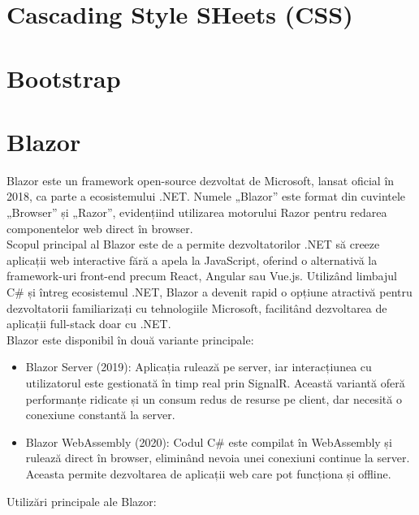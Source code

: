 \section{Cascading Style SHeets (CSS)}
\section{Bootstrap}
\section{Blazor}
 {\hspace*{1cm} Blazor este un framework open-source dezvoltat de Microsoft, lansat oficial în 2018, ca parte a ecosistemului .NET. Numele „Blazor” este format din cuvintele „Browser” și „Razor”, evidențiind utilizarea motorului Razor pentru redarea componentelor web direct în browser.}\parencite{blazor}\\
{\hspace*{1cm} Scopul principal al Blazor este de a permite dezvoltatorilor .NET să creeze aplicații web interactive fără a apela la JavaScript, oferind o alternativă la framework-uri front-end precum React, Angular sau Vue.js. Utilizând limbajul C\# și întreg ecosistemul .NET, Blazor a devenit rapid o opțiune atractivă pentru dezvoltatorii familiarizați cu tehnologiile Microsoft, facilitând dezvoltarea de aplicații full-stack doar cu .NET.}\parencite{blazor}\\
{Blazor este disponibil în două variante principale:}
\begin{itemize}
    \item Blazor Server (2019): Aplicația rulează pe server, iar interacțiunea cu utilizatorul este gestionată în timp real prin SignalR. Această variantă oferă performanțe ridicate și un consum redus de resurse pe client, dar necesită o conexiune constantă la server.
    \item Blazor WebAssembly (2020): Codul C\# este compilat în WebAssembly și rulează direct în browser, eliminând nevoia unei conexiuni continue la server. Aceasta permite dezvoltarea de aplicații web care pot funcționa și offline.
\end{itemize}\parencite{blazor}
{Utilizări principale ale Blazor:}
